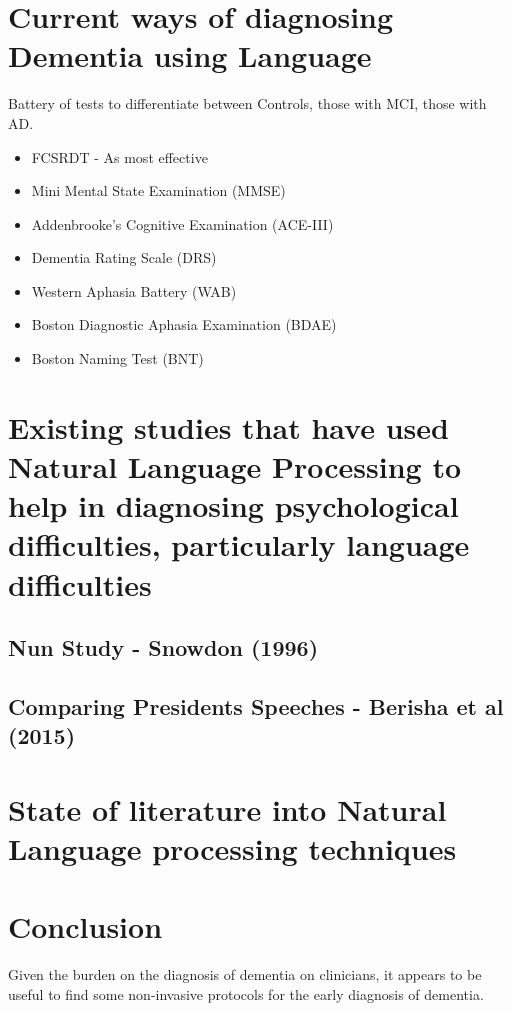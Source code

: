 \documentclass[a4paper]{article}
\begin{document}
\section{Current ways of diagnosing Dementia using Language}
Battery of tests to differentiate between Controls, those with MCI, those with AD. 
\begin{itemize}
	\item FCSRDT - As most effective 
	\item Mini Mental State Examination (MMSE)
	\item Addenbrooke's Cognitive Examination (ACE-III)
	\item Dementia Rating Scale (DRS)
	\item Western Aphasia Battery (WAB)
	\item Boston Diagnostic Aphasia Examination (BDAE)
	\item Boston Naming Test (BNT)
\end{itemize}

\section{Existing studies that have used Natural Language Processing to help in diagnosing psychological difficulties, particularly language difficulties}

\subsection{Nun Study - Snowdon (1996)}
\subsection{Comparing Presidents Speeches - Berisha et al (2015)}

\section{State of literature into Natural Language processing techniques}

\section{Conclusion}
Given the burden on the diagnosis of dementia on clinicians, it appears to be useful to find some non-invasive protocols for the early diagnosis of dementia. 
\end{document}
